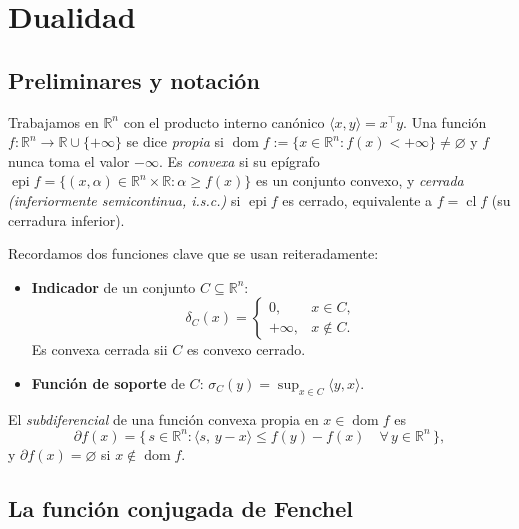 \documentclass[12pt]{book}
\newcommand{\R}{\mathbb{R}}
\newcommand{\dom}{\operatorname{dom}}
\newcommand{\epi}{\operatorname{epi}}
\newcommand{\cl}{\operatorname{cl}}
\newcommand{\subdiff}{\partial}
\newcommand{\indic}{\delta}
\newcommand{\supp}{\sigma}
\theoremstyle{definition}
\theoremstyle{plain}
\theoremstyle{remark}
\begin{document}
\chapter{Dualidad}

\section{Preliminares y notación}\label{sec:prelim}

Trabajamos en $\R^n$ con el producto interno canónico
$\langle x,y\rangle = x^{\!\top} y$.  Una función
$f:\R^n \to \R\cup\{+\infty\}$ se dice \emph{propia} si
$\dom f := \{x\in\R^n : f(x)<+\infty\}\neq\varnothing$ y $f$ nunca
toma el valor $-\infty$.  Es \emph{convexa} si su epígrafo
$\epi f = \{(x,\alpha)\in\R^n\times\R : \alpha\ge f(x)\}$ es un
conjunto convexo, y \emph{cerrada (inferiormente semicontinua, i.s.c.)}
si $\epi f$ es cerrado, equivalente a $f=\cl f$ (su cerradura inferior).

Recordamos dos funciones clave que se usan reiteradamente:
\begin{itemize}[leftmargin=1.2em,itemsep=2pt]
  \item \textbf{Indicador} de un conjunto $C\subseteq\R^n$:
        \[
          \indic_C(x) =
          \begin{cases}
            0,   & x\in C,\\
            +\infty, & x\notin C.
          \end{cases}
        \]
        Es convexa cerrada sii $C$ es convexo cerrado.
  \item \textbf{Función de soporte} de $C$:
        $\supp_C(y)=\sup_{x\in C}\langle y,x\rangle$.
\end{itemize}

El \emph{subdiferencial} de una función convexa propia en $x\in\dom f$ es
\[
  \subdiff f(x) = \{\, s\in\R^n : \langle s,\, y-x\rangle \le f(y)-f(x)
  \quad\forall\, y\in\R^n \,\},
\]
y $\subdiff f(x)=\varnothing$ si $x\notin\dom f$.

\section{La función conjugada de Fenchel}\label{sec:conj}
\end{document}
